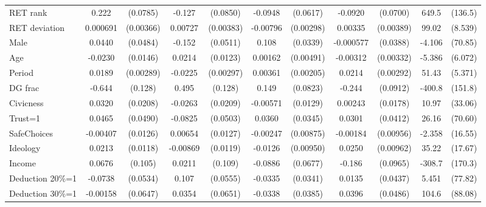 \begin{tabular}{l|cccccc|cc|cc}
\hline
RET rank        &    0.222\sym{***}& (0.0785)&   -0.127         & (0.0850)&  -0.0948         & (0.0617)&  -0.0920         & (0.0700)&    649.5\sym{***}&  (136.5)\\
RET deviation   & 0.000691         &(0.00366)&  0.00727\sym{*}  &(0.00383)& -0.00796\sym{***}&(0.00298)&  0.00335         &(0.00389)&    99.02\sym{***}&  (8.539)\\
Male            &   0.0440         & (0.0484)&   -0.152\sym{***}& (0.0511)&    0.108\sym{***}& (0.0339)&-0.000577         & (0.0388)&   -4.106         &  (70.85)\\
Age             &  -0.0230         & (0.0146)&   0.0214\sym{*}  & (0.0123)&  0.00162         &(0.00491)& -0.00312         &(0.00332)&   -5.386         &  (6.072)\\
Period          &   0.0189\sym{***}&(0.00289)&  -0.0225\sym{***}&(0.00297)&  0.00361\sym{*}  &(0.00205)&   0.0214\sym{***}&(0.00292)&    51.43\sym{***}&  (5.371)\\
DG frac         &   -0.644\sym{***}&  (0.128)&    0.495\sym{***}&  (0.128)&    0.149\sym{*}  & (0.0823)&   -0.244\sym{***}& (0.0912)&   -400.8\sym{***}&  (151.8)\\
Civicness       &   0.0320         & (0.0208)&  -0.0263         & (0.0209)& -0.00571         & (0.0129)&  0.00243         & (0.0178)&    10.97         &  (33.06)\\
Trust=1         &   0.0465         & (0.0490)&  -0.0825         & (0.0503)&   0.0360         & (0.0345)&   0.0301         & (0.0412)&    26.16         &  (70.60)\\
SafeChoices     & -0.00407         & (0.0126)&  0.00654         & (0.0127)& -0.00247         &(0.00875)& -0.00184         &(0.00956)&   -2.358         &  (16.55)\\
Ideology        &   0.0213\sym{*}  & (0.0118)& -0.00869         & (0.0119)&  -0.0126         &(0.00950)&   0.0250\sym{**} &(0.00962)&    35.22\sym{**} &  (17.67)\\
Income          &   0.0676         &  (0.105)&   0.0211         &  (0.109)&  -0.0886         & (0.0677)&   -0.186\sym{*}  & (0.0965)&   -308.7\sym{*}  &  (170.3)\\
Deduction 20\%=1&  -0.0738         & (0.0534)&    0.107\sym{*}  & (0.0555)&  -0.0335         & (0.0341)&   0.0135         & (0.0437)&    5.451         &  (77.82)\\
Deduction 30\%=1& -0.00158         & (0.0647)&   0.0354         & (0.0651)&  -0.0338         & (0.0385)&   0.0396         & (0.0486)&    104.6         &  (88.08)\\

\end{tabular}
